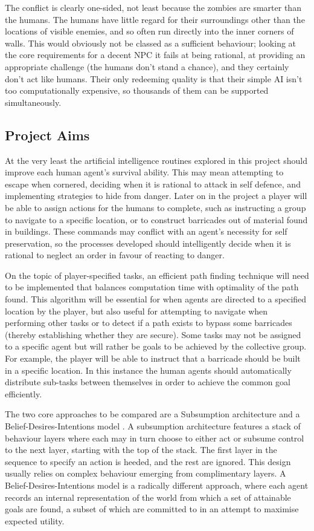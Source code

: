 \documentclass[12pt,a4paper]{article}
\begin{document}
The conflict is clearly one-sided, not least because the zombies are smarter than the humans. The humans have little regard for their surroundings other than the locations of visible enemies, and so often run directly into the inner corners of walls. This would obviously not be classed as a sufficient behaviour; looking at the core requirements for a decent NPC it fails at being rational, at providing an appropriate challenge (the humans don't stand a chance), and they certainly don't act like humans. Their only redeeming quality is that their simple AI isn't too computationally expensive, so thousands of them can be supported simultaneously.

\subsection{Project Aims}\noindent
At the very least the artificial intelligence routines explored in this project should improve each human agent's survival ability. This may mean attempting to escape when cornered, deciding when it is rational to attack in self defence, and implementing strategies to hide from danger. Later on in the project a player will be able to assign actions for the humans to complete, such as instructing a group to navigate to a specific location, or to construct barricades out of material found in buildings. These commands may conflict with an agent's necessity for self preservation, so the processes developed should intelligently decide when it is rational to neglect an order in favour of reacting to danger.

On the topic of player-specified tasks, an efficient path finding technique will need to be implemented that balances computation time with optimality of the path found. This algorithm will be essential for when agents are directed to a specified location by the player, but also useful for attempting to navigate when performing other tasks or to detect if a path exists to bypass some barricades (thereby establishing whether they are secure). Some tasks may not be assigned to a specific agent but will rather be goals to be achieved by the collective group. For example, the player will be able to instruct that a barricade should be built in a specific location. In this instance the human agents should automatically distribute sub-tasks between themselves in order to achieve the common goal efficiently.

The two core approaches to be compared are a Subsumption architecture \cite{brooks90} and a Belief-Desires-Intentions model \cite{rao95}. A subsumption architecture features a stack of behaviour layers where each may in turn choose to either act or subsume control to the next layer, starting with the top of the stack. The first layer in the sequence to specify an action is heeded, and the rest are ignored. This design usually relies on complex behaviour emerging from complimentary layers. A Belief-Desires-Intentions model is a radically different approach, where each agent records an internal representation of the world from which a set of attainable goals are found, a subset of which are committed to in an attempt to maximise expected utility.
\end{document}
